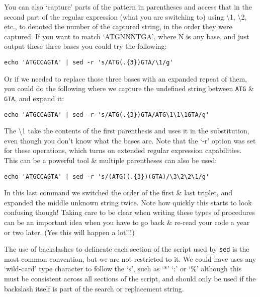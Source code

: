 You can also `capture' parts of the pattern in parentheses and access that in the second part of the regular expression (what you are switching to) using \textbackslash 1, \textbackslash 2, etc., to denoted the number of the captured string, in the order they were captured.
If you want to match `ATGNNNTGA', where N is any base, and just output these three bases you could try the following:\\
\begin{lstlisting}
echo 'ATGCCAGTA' | sed -r 's/ATG(.{3})GTA/\1/g'
\end{lstlisting}

Or if we needed to replace those three bases with an expanded repeat of them, you could do the following where we capture the undefined string between \texttt{ATG} \& \texttt{GTA}, and expand it: \\
\begin{lstlisting}
echo 'ATGCCAGTA' | sed -r 's/ATG(.{3})GTA/ATG\1\1\1GTA/g'
\end{lstlisting}

The \textbackslash 1 take the contents of the first parenthesis and uses it in the substitution, even though you don't know what the bases are.
Note that the `-r' option was set for these operations, which turns on extended regular expression capabilities.
This can be a powerful tool \& multiple parentheses can also be used: \\
\begin{lstlisting}
echo 'ATGCCAGTA' | sed -r 's/(ATG)(.{3})(GTA)/\3\2\2\1/g'
\end{lstlisting}

In this last command we switched the order of the first \& last triplet, and expanded the middle unknown string twice.
Note how quickly this starts to look confusing though!
Taking care to be clear when writing these types of procedures can be an important idea when you have to go back \& re-read your code a year or two later.
(Yes this will happen a lot!!!)

\begin{information}
The use of backslashes to delineate each section of the script used by \texttt{sed} is the most common convention, but we are not restricted to it.
We could have uses any `wild-card' type character to follow the `s', such as `*' `:' or `\%' although this must be consistent across all sections of the script, and should only be used if the backslash itself is part of the search or replacement string.
\end{information}

